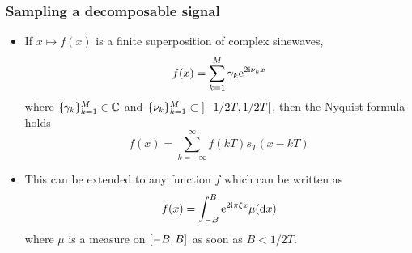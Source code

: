 
\begin{frame}
\frametitle{Sampling a decomposable signal}
\begin{itemize}
\item If $x \mapsto f(x)$ is a finite superposition of complex sinewaves, 
\[
f(x)= \sum_{k=1}^M \gamma_k \mathrm{e}^{2 \mathrm{i} \nu_k x}
\]
where $\{\gamma_k\}_{k=1}^M \in \mathbb{C}$ and $\{ \nu_k \}_{k=1}^M \subset \left]-1/2T,1/2T\right[$, then the Nyquist formula holds
\[
f(x)= \sum_{k=-\infty}^{\infty}  f(kT) s_T(x - kT)
\]
\item This can be extended to any function $f$ which can be written as
\[
f(x)= \int_{-B}^B \mathrm{e}^{2 \mathrm{i} \pi \xi x} \mu(\mathrm{d} x)
\]
where $\mu$ is a measure on $\left[-B,B\right]$ as soon as $B < 1/2T$.
\end{itemize}
\end{frame}

 